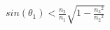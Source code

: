 \documentclass[preview]{standalone}
\begin{document}
\begin{align*}
sin(\theta_1) < \frac{n_2}{n_1}\sqrt{1-\frac{{n_3}^2}{{n_2}^2}}
\end{align*}
\end{document}
